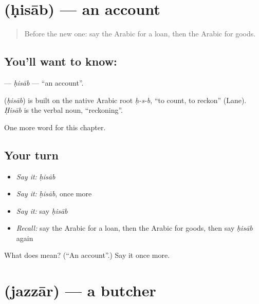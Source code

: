 \section[\texorpdfstring{\ar{حساب} (ḥisāb)}{حساب (ḥisāb)}]{ (ḥisāb) — an account}

\label{lesson:AR-C220-hisab}



\begin{quote}
Before the new one: say the Arabic for a loan, then the Arabic for goods.
\end{quote}

\subsection*{You'll want to know: }
\textbf{} — \emph{ḥisāb} — \textquotedblleft{}an account\textquotedblright{}.

\begin{cousinweb}
\textbf{} (\emph{ḥisāb}) is built on the native Arabic root \emph{ḥ-s-b}, \textquotedblleft{}to count, to reckon\textquotedblright{} (Lane). \emph{Ḥisāb} is the verbal noun, \textquotedblleft{}reckoning\textquotedblright{}.
\end{cousinweb}

\begin{grammarlens}[title={What you've built}]
One more word for this chapter.
\end{grammarlens}

\subsection*{Your turn}
\begin{itemize}
\raggedright
  \item \emph{Say it:} \emph{ḥisāb}
  \item \emph{Say it:} \emph{ḥisāb}, once more
  \item \emph{Say it:} say \emph{ḥisāb}
  \item \emph{Recall:} say the Arabic for a loan, then the Arabic for goods, then say \emph{ḥisāb} again
\end{itemize}

\begin{tcolorbox}[breakable,colback=teal!4,colframe=teal!35!black,title={Before you move on}]
What does  mean? (\textquotedblleft{}An account\textquotedblright{}.) Say it once more.
\end{tcolorbox}
\section[\texorpdfstring{\ar{جزار} (jazzār)}{جزار (jazzār)}]{ (jazzār) — a butcher}

